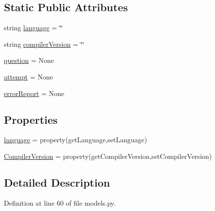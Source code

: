 \subsection*{Static Public Attributes}
\begin{DoxyCompactItemize}
\item 
string \hyperlink{class_ecodena_1_1_compiler_1_1models_1_1_compiler_a7f7abbdc4ae677a6e0d967a2970ec930}{language} = \char`\"{}\char`\"{}
\item 
string \hyperlink{class_ecodena_1_1_compiler_1_1models_1_1_compiler_aaf93790fadd78c7b65166de0be0215e7}{compilerVersion} = \char`\"{}\char`\"{}
\item 
\hyperlink{class_ecodena_1_1_compiler_1_1models_1_1_compiler_ae14bb831a09036b817bcd4130c2d5374}{question} = None
\item 
\hyperlink{class_ecodena_1_1_compiler_1_1models_1_1_compiler_a29944b6cb9b176cb968e5d982f2c1ec2}{attempt} = None
\item 
\hyperlink{class_ecodena_1_1_compiler_1_1models_1_1_compiler_a1f6a19542290c2bb59174f9ce2aa7046}{errorReport} = None
\end{DoxyCompactItemize}
\subsection*{Properties}
\begin{DoxyCompactItemize}
\item 
\hyperlink{class_ecodena_1_1_compiler_1_1models_1_1_compiler_af0df2c485e0650c50a1cd6e968addfa7}{language} = property(getLanguage,setLanguage)
\item 
\hyperlink{class_ecodena_1_1_compiler_1_1models_1_1_compiler_af9f7faa093cfc8b501d201661cefabeb}{CompilerVersion} = property(getCompilerVersion,setCompilerVersion)
\end{DoxyCompactItemize}


\subsection{Detailed Description}


Definition at line 60 of file models.py.



